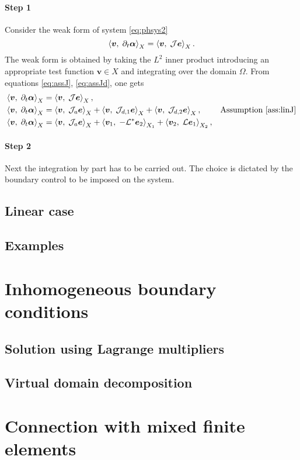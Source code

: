 \paragraph{Step 1} Consider the weak form of system \eqref{eq:phsys2}
\begin{equation}
\inner[X]{\bm{v}}{\partial_t \bm{\alpha}} = \inner[X]{\bm{v}}{\mathcal{J} \bm{e}}.
\end{equation}
The weak form is obtained by taking the $L^2$ inner product introducing an appropriate test function $\bm{v} \in X$ and integrating over the domain $\Omega$. From equations \eqref{eq:assJ}, \eqref{eq:assJd}, one gets 
\begin{equation}
\begin{aligned}
\inner[X]{\bm{v}}{\partial_t \bm{\alpha}} &= \inner[X]{\bm{v}}{\mathcal{J} \bm{e}}, \\
\inner[X]{\bm{v}}{\partial_t \bm{\alpha}} &= \inner[X]{\bm{v}}{\mathcal{J}_a\bm{e}} + \inner[X]{\bm{v}}{\mathcal{J}_{d, 1}\bm{e}} + \inner[X]{\bm{v}}{\mathcal{J}_{d, 2} \bm{e}}, &\text{Assumption \ref{ass:linJ}} \\
\inner[X]{\bm{v}}{\partial_t \bm{\alpha}} &=  \inner[X]{\bm{v}}{\mathcal{J}_a\bm{e}} +  \inner[X_1]{\bm{v}_1}{-\mathcal{L}^*\bm{e}_2} + \inner[X_2]{\bm{v}_2}{\mathcal{L}\bm{e}_1} , \\
\end{aligned}
\end{equation}
\paragraph{Step 2} Next the integration by part has to be carried out. The choice is dictated by the boundary control to be imposed on the system.
\subsection{Linear case}

\subsection{Examples}

\section{Inhomogeneous boundary conditions}\label{sec:mixedbc}

\subsection{Solution using Lagrange multipliers}

\subsection{Virtual domain decomposition}


\section{Connection with mixed finite elements}





